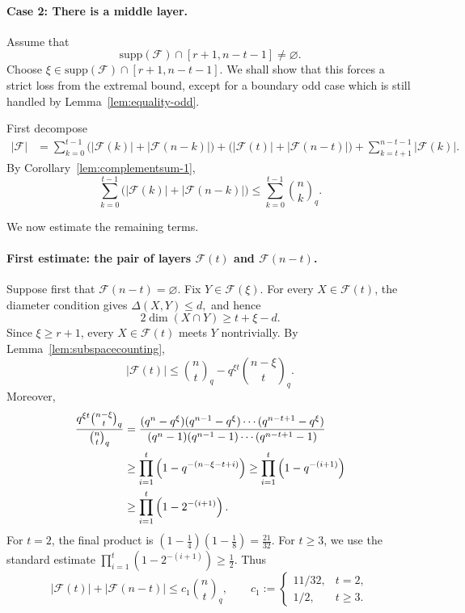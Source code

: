 \documentclass[11pt]{article}
\theoremstyle{definition}
\newcommand{\qbinom}[2]{\genfrac{(}{)}{0pt}{}{#1}{#2}_q}
\newcommand{\supp}{\mathrm{supp}}
\begin{document}
\paragraph{Case 2: There is a middle layer.}

Assume that
\begin{equation}\label{eq:middle-layer-exists}
\supp(\mathcal F)\cap [r+1,n-t-1]\neq \varnothing.
\end{equation}
Choose
\(
\xi\in \supp(\mathcal F)\cap [r+1,n-t-1].
\)
We shall show that this forces a strict loss from the extremal bound, except for a boundary odd case which is still handled by Lemma~\ref{lem:equality-odd}.

First decompose
\begin{align*}
|\mathcal F|
&=
\sum_{k=0}^{t-1}
\bigl(|\mathcal F(k)|+|\mathcal F(n-k)|\bigr)
+
\bigl(|\mathcal F(t)|+|\mathcal F(n-t)|\bigr)
+
\sum_{k=t+1}^{n-t-1}|\mathcal F(k)|.
\end{align*}
By Corollary~\ref{lem:complementsum-1},
\begin{equation}\label{eq:lower-pairs}
\sum_{k=0}^{t-1}
\bigl(|\mathcal F(k)|+|\mathcal F(n-k)|\bigr)
\le
\sum_{k=0}^{t-1}\qbinom{n}{k}.
\end{equation}

We now estimate the remaining terms.

\paragraph{First estimate: the pair of layers $\mathcal F(t)$ and $\mathcal F(n-t)$.}

Suppose first that $\mathcal F(n-t)=\varnothing$. 
Fix $Y\in\mathcal F(\xi)$. 
For every $X\in\mathcal F(t)$, the diameter condition gives
\(
\Delta(X,Y)\le d,
\)
and hence
\[
2\dim(X\cap Y)
\ge
t+\xi-d.
\]
Since $\xi\ge r+1$, every $X\in\mathcal F(t)$ meets $Y$ nontrivially. 
By Lemma~\ref{lem:subspacecounting},
\begin{equation*}
|\mathcal F(t)|
\le
\qbinom{n}{t}
-
q^{\xi t}\qbinom{n-\xi}{t}.
\end{equation*}
Moreover,
\begin{align*}
\frac{q^{\xi t}\qbinom{n-\xi}{t}}{\qbinom{n}{t}}
&=
\frac{(q^n-q^\xi)(q^{n-1}-q^\xi)\cdots(q^{n-t+1}-q^\xi)}
{(q^n-1)(q^{n-1}-1)\cdots(q^{n-t+1}-1)}
\notag\\
&\ge
\prod_{i=1}^{t}\left(1-q^{-(n-\xi-t+i)}\right)
\ge
\prod_{i=1}^{t}\left(1-q^{-(i+1)}\right)
\notag\\
&\ge
\prod_{i=1}^{t}\left(1-2^{-(i+1)}\right).
\end{align*}
For $t=2$, the final product is
\(
\left(1-\frac14\right)\left(1-\frac18\right)=\frac{21}{32}.
\)
For $t\ge 3$, we use the standard estimate
\(
\prod_{i=1}^{t}\left(1-2^{-(i+1)}\right)\ge \frac12.
\)
Thus
\begin{equation}\label{eq:c1-A}
|\mathcal F(t)|+|\mathcal F(n-t)|
\le
c_1\qbinom{n}{t},
\qquad
c_1:=
\begin{cases}
11/32, & t=2,\\
1/2, & t\ge 3.
\end{cases}
\end{equation}
\end{document}
